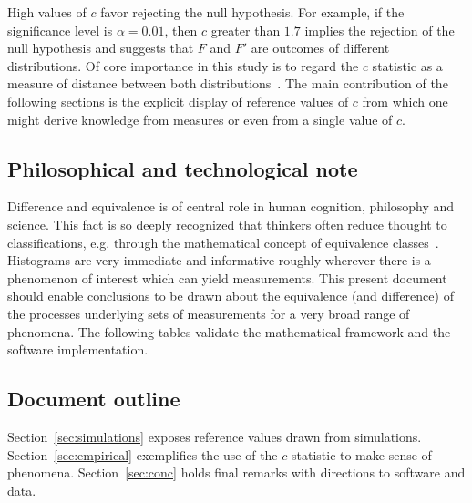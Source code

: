 \documentclass[%
	aip,
	jmp,%
	amsmath,amssymb,
	reprint,%
]{revtex4-1}
\begin{document}
High values of $c$ favor rejecting the null hypothesis.
For example, if the significance level is $\alpha=0.01$,
then $c$ greater than $1.7$
implies the rejection of the null hypothesis and
suggests that $F$ and $F'$
are outcomes of different distributions.
Of core importance in this study is to regard the $c$ statistic
as a measure of distance between both distributions~\cite{kolm}.
The main contribution of the following sections is the
explicit display of reference values of $c$
from which one might derive knowledge from
measures or even from a single value of $c$.

%
%


\subsection{Philosophical and technological note}
Difference and equivalence is of central role in human cognition,
philosophy and science.
This fact is so deeply recognized that thinkers often reduce
thought to classifications, e.g. through the
mathematical concept of equivalence classes~\cite{deleuze}.
Histograms are very immediate and informative
roughly wherever there is a phenomenon of interest which can yield measurements.
This present document should enable conclusions to be drawn about 
the equivalence (and difference)
of the processes underlying sets of measurements for a very
broad range of phenomena.
The following tables 
validate the mathematical framework
and the software implementation.

\subsection{Document outline}
Section~\ref{sec:simulations} exposes reference values drawn from simulations.
Section~\ref{sec:empirical} exemplifies the use of the $c$ statistic
to make sense of phenomena.
Section~\ref{sec:conc} holds final remarks with directions to
software and data.
\end{document}
